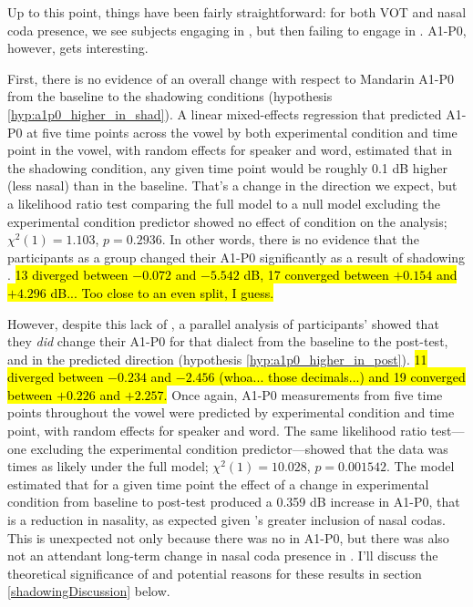     Up to this point, things have been fairly straightforward: for both VOT and nasal coda presence, we see subjects engaging in \sta{}, but then failing to engage in \lta{}. A1-P0, however, gets interesting.
    
    First, there is no evidence of an overall change with respect to Mandarin A1-P0 from the baseline to the shadowing conditions (hypothesis \ref{hyp:a1p0_higher_in_shad}). A linear mixed-effects regression that predicted A1-P0 at five time points across the vowel by both experimental condition and time point in the vowel, with random effects for speaker and word, estimated that in the shadowing condition, any given time point would be roughly 0.1 dB higher (less nasal) than in the baseline. That's a change in the direction we expect, but a likelihood ratio test comparing the full model to a null model excluding the experimental condition predictor showed no effect of condition on the analysis; $\chi^2 (1) = 1.103$, $p = 0.2936$. In other words, there is no evidence that the participants as a group changed their A1-P0 significantly as a result of shadowing \annie{}. \hl{13 diverged between $-0.072$ and $-5.542$ dB, 17 converged between $+0.154$ and $+4.296$ dB... Too close to an even split, I guess.}
    
    However, despite this lack of \sta{}, a parallel analysis of participants' \ND{} showed that they \emph{did} change their A1-P0 for that dialect from the baseline to the post-test, and in the predicted direction (hypothesis \ref{hyp:a1p0_higher_in_post}). \hl{11 diverged between $-0.234$ and $-2.456$ (whoa... those decimals...) and 19 converged between $+0.226$ and $+2.257$.} Once again, A1-P0 measurements from five time points throughout the vowel were predicted by experimental condition and time point, with random effects for speaker and word. The same likelihood ratio test---one excluding the experimental condition predictor---showed that the data was \xxxxx{} times as likely under the full model; $\chi^2 (1) = 10.028$, $p = 0.001542$. The model estimated that for a given time point the effect of a change in experimental condition from baseline to post-test produced a 0.359 dB increase in A1-P0, that is a reduction in nasality, as expected given \annie{}'s greater inclusion of nasal codas. This is unexpected not only because there was no \sta{} in A1-P0, but there was also not an attendant long-term change in nasal coda presence in \ND{}. I'll discuss the theoretical significance of and potential reasons for these results in section \ref{shadowingDiscussion} below.

